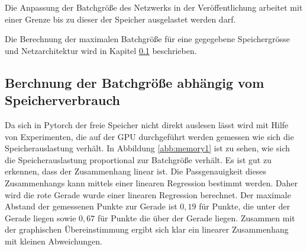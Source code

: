 Die Anpassung der Batchgröße des Netzwerks in der Veröffentlichung arbeitet mit einer Grenze bis zu dieser der Speicher ausgelastet werden darf. 

Die Berechnung der maximalen Batchgröße für eine gegegebene Speichergrösse und Netzarchitektur wird in Kapitel \ref{sec:batch} beschrieben.

\subsection{Berchnung der Batchgröße abhängig vom Speicherverbrauch}\label{sec:batch}
Da sich in Pytorch der freie Speicher nicht direkt auslesen lässt wird mit Hilfe von Experimenten, die auf der GPU durchgeführt werden gemessen wie sich die Speicherauslastung verhält. In Abbildung \ref{abb:memory1} ist zu sehen, wie sich die Speicherauslastung proportional zur Batchgröße verhält. Es ist gut zu erkennen, dass der Zusammenhang linear ist. Die Passgenauigkeit dieses Zusammenhangs kann mittels einer linearen Regression bestimmt werden.  Daher wird  die rote Gerade wurde einer linearen Regression berechnet. Der maximale Abstand der gemessenen Punkte zur Gerade ist $0,19$ für Punkte, die unter der Gerade liegen sowie $0,67$ für Punkte die über der Gerade liegen. Zusammen mit der graphischen Übereinstimmung ergibt sich klar ein linearer Zusammenhang mit kleinen Abweichungen.
